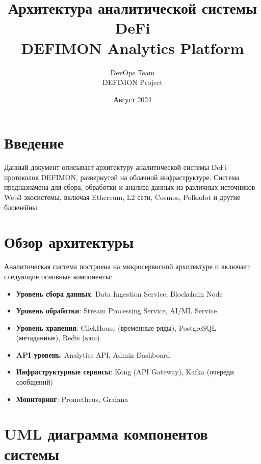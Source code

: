 \documentclass[11pt,a4paper]{article}
\title{Архитектура аналитической системы DeFi\\ DEFIMON Analytics Platform}
\author{DevOps Team\\ DEFIMON Project}
\date{Август 2024}
\begin{document}
\maketitle

\tableofcontents
\newpage

\section{Введение}

Данный документ описывает архитектуру аналитической системы DeFi протоколов DEFIMON, развернутой на облачной инфраструктуре. Система предназначена для сбора, обработки и анализа данных из различных источников Web3 экосистемы, включая Ethereum, L2 сети, Cosmos, Polkadot и другие блокчейны.

\section{Обзор архитектуры}

Аналитическая система построена на микросервисной архитектуре и включает следующие основные компоненты:

\begin{itemize}
    \item \textbf{Уровень сбора данных}: Data Ingestion Service, Blockchain Node
    \item \textbf{Уровень обработки}: Stream Processing Service, AI/ML Service
    \item \textbf{Уровень хранения}: ClickHouse (временные ряды), PostgreSQL (метаданные), Redis (кэш)
    \item \textbf{API уровень}: Analytics API, Admin Dashboard
    \item \textbf{Инфраструктурные сервисы}: Kong (API Gateway), Kafka (очереди сообщений)
    \item \textbf{Мониторинг}: Prometheus, Grafana
\end{itemize}

\section{UML диаграмма компонентов системы}
\end{document}

